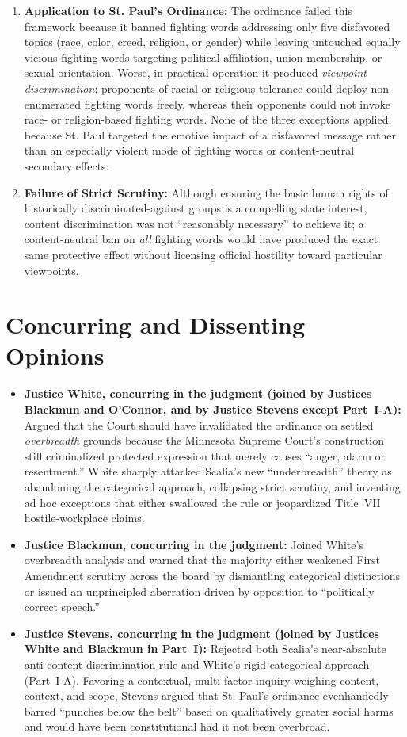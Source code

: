 \documentclass[12pt]{article}
\begin{document}
\begin{enumerate}
\begin{itemize}
  \end{itemize}
  \item \textbf{Application to St. Paul's Ordinance:} The ordinance failed this framework because it banned fighting words addressing only five disfavored topics (race, color, creed, religion, or gender) while leaving untouched equally vicious fighting words targeting political affiliation, union membership, or sexual orientation. Worse, in practical operation it produced \textit{viewpoint discrimination}: proponents of racial or religious tolerance could deploy non-enumerated fighting words freely, whereas their opponents could not invoke race- or religion-based fighting words. None of the three exceptions applied, because St. Paul targeted the emotive impact of a disfavored message rather than an especially violent mode of fighting words or content-neutral secondary effects.
  \item \textbf{Failure of Strict Scrutiny:} Although ensuring the basic human rights of historically discriminated-against groups is a compelling state interest, content discrimination was not ``reasonably necessary'' to achieve it; a content-neutral ban on \textit{all} fighting words would have produced the exact same protective effect without licensing official hostility toward particular viewpoints.
\end{enumerate}

\section{Concurring and Dissenting Opinions}
\begin{itemize}
  \item \textbf{Justice White, concurring in the judgment (joined by Justices Blackmun and O'Connor, and by Justice Stevens except Part~I-A):} Argued that the Court should have invalidated the ordinance on settled \textit{overbreadth} grounds because the Minnesota Supreme Court's construction still criminalized protected expression that merely causes ``anger, alarm or resentment.'' White sharply attacked Scalia's new ``underbreadth'' theory as abandoning the categorical approach, collapsing strict scrutiny, and inventing ad hoc exceptions that either swallowed the rule or jeopardized Title~VII hostile-workplace claims.
  \item \textbf{Justice Blackmun, concurring in the judgment:} Joined White's overbreadth analysis and warned that the majority either weakened First Amendment scrutiny across the board by dismantling categorical distinctions or issued an unprincipled aberration driven by opposition to ``politically correct speech.''
  \item \textbf{Justice Stevens, concurring in the judgment (joined by Justices White and Blackmun in Part~I):} Rejected both Scalia's near-absolute anti-content-discrimination rule and White's rigid categorical approach (Part~I-A). Favoring a contextual, multi-factor inquiry weighing content, context, and scope, Stevens argued that St. Paul's ordinance evenhandedly barred ``punches below the belt'' based on qualitatively greater social harms and would have been constitutional had it not been overbroad.
\end{itemize}
\end{document}
